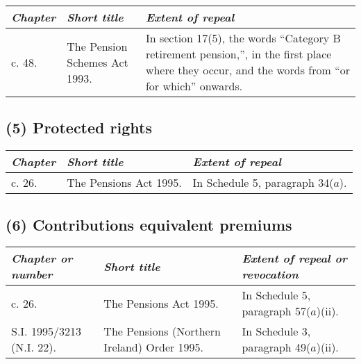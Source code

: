 \documentclass[12pt,a4paper]{article}
\begin{document}
{\footnotesize
\begin{longtable}{p{45.96pt}p{55.78545pt}p{252.25719pt}}
\hline
\itshape Chapter	&\itshape Short title	&\itshape Extent of repeal\\
\hline
\endhead
\hline
\endlastfoot
1993 c. 48. 	&The Pension Schemes Act 1993. 	&In section 17(5), the words “Category B retirement pension,”, in the first place where they occur, and the words from “or for which” onwards.\\
\end{longtable}

}

\subsection*{(5) 
Protected rights}

{\footnotesize
\begin{longtable}{lll}
\hline
\itshape Chapter	&\itshape Short title	&\itshape Extent of repeal\\
\hline
\endhead
\hline
\endlastfoot
1995 c. 26. 	&The Pensions Act 1995. 	&In Schedule 5, paragraph 34($a$).\\
\end{longtable}

}

\enlargethispage{\baselineskip}

\subsection*{(6) 
Contributions equivalent premiums}

{\footnotesize
\begin{longtable}{p{81.02374pt}p{155.22356pt}p{117.7467pt}}
\hline
\itshape Chapter or number	&\itshape Short title	&\itshape Extent of repeal or revocation\\
\hline
\endhead
\hline
\endlastfoot
1995 c. 26. 	&The Pensions Act 1995. 	&In Schedule 5, paragraph 57($a$)(ii).\\
S.I. 1995/3213 (N.I. 22).	&The Pensions (Northern Ireland) Order 1995. 	&In Schedule 3, paragraph 49($a$)(ii).\\
\end{longtable}

}
\end{document}
